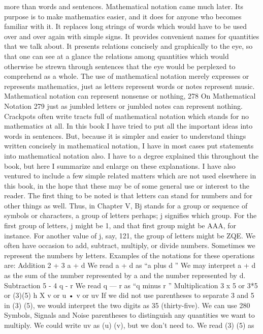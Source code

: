 {{{{{{{{{{{{more than words and sentences. Mathematical notation came
much later. Its purpose is to make mathematics easier, and it does
for anyone who becomes familiar with it. It replaces long strings
of words which would have to be used over and over again with
simple signs. It provides convenient names for quantities that we
talk about. It presents relations concisely and graphically to the
eye, so that one can see at a glance the relations among quantities
which would otherwise be strewn through sentences that the eye
would be perplexed to comprehend as a whole.
The use of mathematical notation merely expresses or represents
mathematics, just as letters represent words or notes represent
music. Mathematical notation can represent nonsense or nothing,
278
On Mathematical Notation 279
just as jumbled letters or jumbled notes can represent nothing.
Crackpots often write tracts full of mathematical notation which
stands for no mathematics at all.
In this book I have tried to put all the important ideas into words
in sentences. But, because it is simpler and easier to understand
things written concisely in mathematical notation, I have in most
cases put statements into mathematical notation also. I have to a
degree explained this throughout the book, but here I summarize
and enlarge on these explanations. I have also ventured to include
a few simple related matters which are not used elsewhere in this
book, in the hope that these may be of some general use or interest
to the reader.
The first thing to be noted is that letters can stand for numbers
and for other things as well. Thus, in Chapter V, Bj stands for a
group or sequence of symbols or characters, a group of letters
perhaps; j signifies which group. For the first group of letters, j
might be 1, and that first group might be AAA, for instance. For
another value of j, say, 121, the group of letters might be ZQE.
We often have occasion to add, subtract, multiply, or divide
numbers. Sometimes we represent the numbers by letters. Examples
of the notations for these operations are:
Addition
2 + 3
a + d
We read a + d as “a plus d ” We may interpret a + d as the sum of
the number represented by a and the number represented by d.
Subtraction
5 - 4
q - r
We read q — r as “q minus r ”
Multiplication
3 x 5 or 3*5 or (3)(5)
h X v or u • v or uv
If we did not use parentheses to separate 3 and 5 in (3) (5), we
would interpret the two digits as 35 (thirty-five). We can use
280
Symbols, Signals and Noise
parentheses to distinguish any quantities we want to multiply. We
could write uv as (u) (v), but we don’t need to. We read (3) (5) as
}}}}}}}}}}}}
